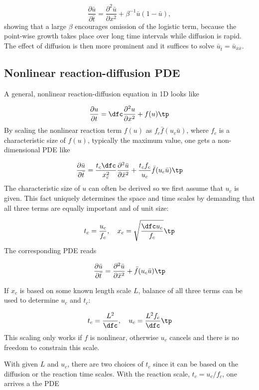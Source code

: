 \documentclass[graybox,envcountchap,sectrefs,final]{svmonodo}
\begin{document}
\begin{equation}
\frac{\partial \bar u}{\partial \bar t} =
\frac{\partial^2 \bar u}{\partial x^2} + \beta^{-1}\bar u (1 - \bar u),
\end{equation}
showing that a large $\beta$ encourages omission of the logistic term,
because the point-wise growth takes place over long time intervals while
diffusion is rapid. The effect of diffusion is then more prominent
and it suffices to solve $\bar u_{\bar t} = \bar u_{\bar x\bar x}$.


\subsection{Nonlinear reaction-diffusion PDE}

A general, nonlinear reaction-diffusion equation in 1D looks like

\begin{equation}
\frac{\partial u}{\partial t} = \dfc\frac{\partial^2 u}{\partial x^2} + f(u)
\tp
\end{equation}
By scaling the nonlinear reaction term $f(u)$ as $f_c\bar f(u_c\bar u)$,
where $f_c$ is a characteristic size of $f(u)$, typically the maximum
value, one gets a non-dimensional PDE like

\[
\frac{\partial\bar u}{\partial\bar t} = \frac{t_c\dfc}{x_c^2}
\frac{\partial^2\bar u}{\partial\bar x^2} +
\frac{t_cf_c}{u_c}\bar f(u_c\bar u)\tp
\]
The characteristic size of $u$ can often be derived so we first assume
that $u_c$ is given. This fact uniquely determines the space and time
scales by demanding that all three terms are equally important and
of unit size:

\[ t_c = \frac{u_c}{f_c},\quad x_c = \sqrt{\frac{\dfc u_c}{f_c}}\tp\]
The corresponding PDE reads

\begin{equation}
\frac{\partial\bar u}{\partial\bar t} =
\frac{\partial^2\bar u}{\partial\bar x^2} + \bar f(u_c\bar u)\tp
\end{equation}

If $x_c$ is based on some known length scale $L$, balance of all three
terms can be used to determine $u_c$ and $t_c$:

\[ t_c = \frac{L^2}{\dfc},\quad u_c = \frac{L^2 f_c}{\dfc}\tp\]
This scaling only works if $f$ is nonlinear, otherwise $u_c$ cancels
and there is no freedom to constrain this scale.

With given $L$ and $u_c$, there are two choices of $t_c$ since it can
be based on the diffusion or the reaction time scales. With
the reaction scale, $t_c = u_c/f_c$, one arrives a the PDE
\end{document}
